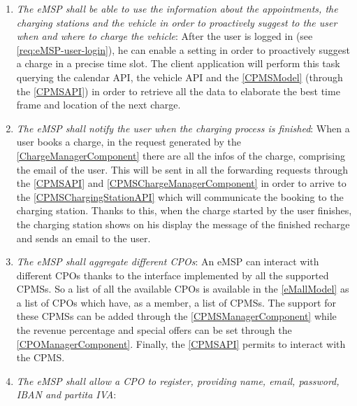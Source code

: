 \begin{enumerate}[label=\textbf{R\arabic*}]
    \label{req:eMSP-connect-calendar}
    \item \textit{The \ac{eMSP} shall be able to use the information about the appointments, the charging stations and the vehicle in order to proactively suggest to the user when and where to charge the vehicle}:
    After the user is logged in (see \ref{req:eMSP-user-login}), he can enable a setting in order to proactively suggest a charge in a precise time slot. 
    The client application will perform this task querying the calendar API, the vehicle API and the \ref{CPMSModel} (through the \ref{CPMSAPI}) in order to retrieve all the data to elaborate the best time frame and location of the next charge.
    \label{req:eMSP-proactive-suggestions}
    \item \textit{The \ac{eMSP} shall notify the user when the charging process is finished}:
    When a user books a charge, in the request generated by the \ref{ChargeManagerComponent} there are all the infos of the charge, comprising the email of the user. This will be sent in all the forwarding requests through the \ref{CPMSAPI} and \ref{CPMSChargeManagerComponent} in order to arrive to the \ref{CPMSChargingStationAPI} which will communicate the booking to the charging station.
    Thanks to this, when the charge started by the user finishes, the charging station shows on his display the message of the finished recharge and sends an email to the user.
    \label{req:eMSP-notification}
    \item \textit{The \ac{eMSP} shall aggregate different \acp{CPO}}:
    An \ac{eMSP} can interact with different \acp{CPO} thanks to the interface implemented by all the supported \acp{CPMS}. 
    So a list of all the available \acp{CPO} is available in the \ref{eMallModel} as a list of \acp{CPO} which have, as a member, a list of \acp{CPMS}. 
    The support for these \acp{CPMS} can be added through the \ref{CPMSManagerComponent} while the revenue percentage and special offers can be set through the \ref{CPOManagerComponent}. 
    Finally, the \ref{CPMSAPI} permits to interact with the \ac{CPMS}.
    \label{req:eMSP-compatible}
    \item \textit{The \ac{eMSP} shall allow a \ac{CPO} to register, providing name, email, password, \ac{IBAN} and \gls{partita IVA}}: 

\end{enumerate}
